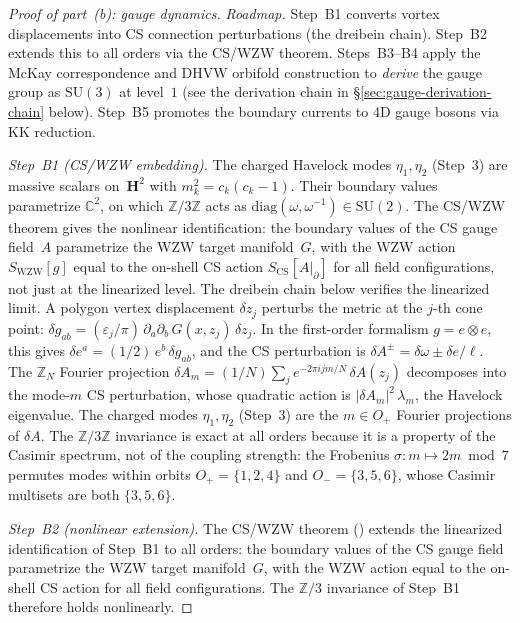 \begin{proof}[Proof of part~(b): gauge dynamics]
\emph{Roadmap.}
Step~B1 converts vortex displacements into CS connection
perturbations (the dreibein chain).
Step~B2 extends this to all orders via the CS/WZW theorem.
Steps~B3--B4 apply the McKay correspondence and DHVW orbifold
construction to \emph{derive} the gauge group as $\mathrm{SU}(3)$ at level~$1$
(see the derivation chain in \S\ref{sec:gauge-derivation-chain} below).
Step~B5 promotes the boundary currents to 4D gauge bosons via KK reduction.

\emph{Step~B1 (CS/WZW embedding).}
The charged Havelock modes $\eta_1, \eta_2$ (Step~3) are
massive scalars on~$\mathbf{H}^2$ with $m_k^2 = c_k(c_k{-}1)$.
Their boundary values parametrize $\mathbb{C}^2$, on which
$\mathbb{Z}/3\mathbb{Z}$ acts as
$\mathrm{diag}(\omega, \omega^{-1}) \in \mathrm{SU}(2)$.
The CS/WZW theorem \citep{Witten1988} gives the
nonlinear identification: the boundary values of the
CS gauge field~$A$ parametrize the WZW target
manifold~$G$, with the WZW action $S_{\mathrm{WZW}}[g]$
equal to the on-shell CS action
$S_{\mathrm{CS}}[A|_{\partial}]$ for all
field configurations, not just at the linearized level.
The dreibein chain below verifies the linearized limit.
A polygon vertex displacement $\delta z_j$ perturbs the
metric at the $j$-th cone point:
$\delta g_{ab} = (\varepsilon_j/\pi)\,
\partial_a\partial_b\,G(x, z_j)\,\delta z_j$.
In the first-order formalism $g = e \otimes e$, this gives
$\delta e^a = (1/2)\,e^b\,\delta g_{ab}$, and the
CS perturbation is
$\delta A^\pm = \delta\omega \pm \delta e/\ell$.
The $\mathbb{Z}_N$ Fourier projection
$\delta A_m = (1/N)\sum_j e^{-2\pi ijm/N}\,\delta A(z_j)$
decomposes into the mode-$m$ CS perturbation,
whose quadratic action is
$|\delta A_m|^2\,\lambda_m$, the Havelock eigenvalue.
The charged modes $\eta_1, \eta_2$ (Step~3)
are the $m \in O_+$ Fourier projections of $\delta A$.
The $\mathbb{Z}/3\mathbb{Z}$ invariance is exact at all orders
because it is a property of the Casimir spectrum, not of the
coupling strength: the Frobenius $\sigma\colon m \mapsto 2m \bmod 7$
permutes modes within orbits $O_+ = \{1,2,4\}$ and
$O_- = \{3,5,6\}$, whose Casimir multisets are both $\{3,5,6\}$.

\emph{Step~B2 (nonlinear extension).}
The CS/WZW theorem (\citealt{Witten1988}) extends the
linearized identification of Step~B1 to all orders:
the boundary values of the CS gauge field parametrize
the WZW target manifold~$G$, with the WZW action equal
to the on-shell CS action for all field configurations.
The $\mathbb{Z}/3$ invariance of Step~B1 therefore holds
nonlinearly.


\end{proof}
